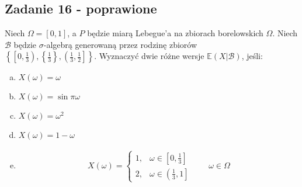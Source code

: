 \subsection*{Zadanie 16 - poprawione}
Niech $ \Omega=[0,1] $, a $ P $ będzie miarą Lebegue'a na zbiorach borelowskich $ \Omega $. Niech $ \mathcal B $ będzie $ \sigma $-algebrą generowaną przez rodzinę zbiorów\\ $ \left\{\left[0,\frac{1}{3}\right) ,\left\{\frac{1}{3}\right\},\left(\frac{1}{3},\frac{1}{2}\right]\right\} $. Wyznaczyć dwie różne wersje $ \mathbb E \left(X|\mathcal B\right) $, jeśli:
\begin{enumerate}[(a)]
\item $ X(\omega)=\omega $
\item $ X(\omega)=\sin\pi\omega $
\item $ X(\omega)=\omega^2 $
\item $ X(\omega)=1-\omega $
\item 
\begin{gather*}
X(\omega)=\left \{
\begin{array}{ll}
	1, & \omega\in\left[0,\frac{1}{3}\right] \\
	2, & \omega\in\left (\frac{1}{3},1\right ]
\end{array}
\right .
\qquad\omega\in\Omega
\end{gather*}
\end{enumerate}


